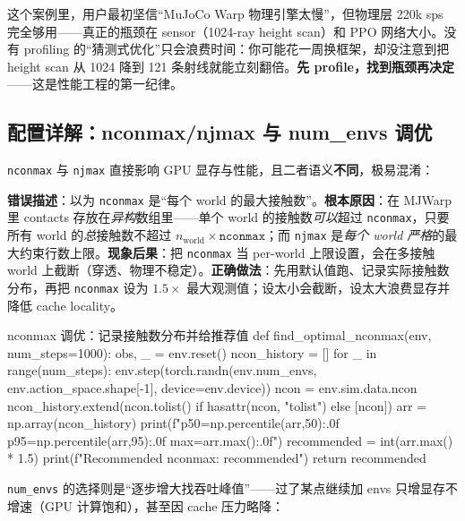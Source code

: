 \begin{insight}\label{ins:rlmc-ls-perf-guess}
这个案例里，用户最初坚信“MuJoCo Warp 物理引擎太慢”，但物理层 220k sps 完全够用——真正的瓶颈在 sensor（1024-ray height scan）和 PPO 网络大小。没有 profiling 的“猜测式优化”只会浪费时间：你可能花一周换框架，却没注意到把 height scan 从 1024 降到 121 条射线就能立刻翻倍。\textbf{先 profile，找到瓶颈再决定}——这是性能工程的第一纪律。
\end{insight}

\subsection{配置详解：nconmax/njmax 与 num\_envs 调优}
\label{sec:rlmc-ls-nconmax}

\verb|nconmax| 与 \verb|njmax| 直接影响 GPU 显存与性能，且二者语义\textbf{不同}，极易混淆：

\begin{pitfall}
\textbf{错误描述}：以为 \verb|nconmax| 是“每个 world 的最大接触数”。\textbf{根本原因}：在 MJWarp 里 contacts 存放在\emph{异构}数组里——单个 world 的接触数\emph{可以}超过 \verb|nconmax|，只要所有 world 的\emph{总}接触数不超过 $n_{\text{world}}\times\texttt{nconmax}$；而 \verb|njmax| 是\emph{每个 world 严格}的最大约束行数上限。\textbf{现象后果}：把 \verb|nconmax| 当 per-world 上限设置，会在多接触 world 上截断（穿透、物理不稳定）。\textbf{正确做法}：先用默认值跑、记录实际接触数分布，再把 \verb|nconmax| 设为 $1.5\times$ 最大观测值；设太小会截断，设太大浪费显存并降低 cache locality。
\end{pitfall}

\begin{codebox}[Python]{nconmax 调优：记录接触数分布并给推荐值}
def find_optimal_nconmax(env, num_steps=1000):
    obs, _ = env.reset()
    ncon_history = []
    for _ in range(num_steps):
        env.step(torch.randn(env.num_envs, env.action_space.shape[-1], device=env.device))
        ncon = env.sim.data.ncon
        ncon_history.extend(ncon.tolist() if hasattr(ncon, "tolist") else [ncon])
    arr = np.array(ncon_history)
    print(f"p50={np.percentile(arr,50):.0f} p95={np.percentile(arr,95):.0f} max={arr.max():.0f}")
    recommended = int(arr.max() * 1.5)
    print(f"Recommended nconmax: {recommended}")
    return recommended
\end{codebox}

\verb|num_envs| 的选择则是“逐步增大找吞吐峰值”——过了某点继续加 envs 只增显存不增速（GPU 计算饱和），甚至因 cache 压力略降：

